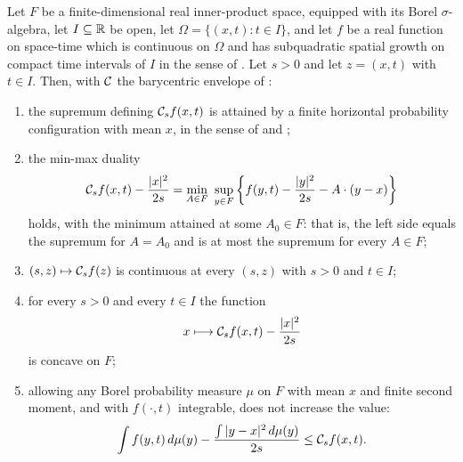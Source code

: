\begin{lemma}
Let $F$ be a finite-dimensional real inner-product space, equipped with its
Borel $\sigma$-algebra, let $I\subseteq\mathbb{R}$ be
open, let $\Omega=\{(x,t):t\in I\}$, and let $f$ be a real function on space-time
which is continuous on $\Omega$ and has subquadratic spatial growth on compact
time intervals of $I$ in the sense of . Let $s>0$
and let $z=(x,t)$ with $t\in I$. Then, with $\mathcal{C}$ the barycentric envelope of
:
\begin{enumerate}
\item the supremum defining $\mathcal{C}_sf(x,t)$ is attained by a finite horizontal
probability configuration with mean $x$, in the sense of 
and ;
\item the min-max duality
\begin{equation}\label{eq:barycentric-duality}
  \mathcal{C}_s f(x,t)-\frac{|x|^2}{2s}
   =\min_{A\in F}\ \sup_{y\in F}
       \left\{f(y,t)-\frac{|y|^2}{2s}-A\cdot(y-x)\right\}
\end{equation}
holds, with the minimum attained at some $A_0\in F$: that is, the left side
equals the supremum for $A=A_0$ and is at most the supremum for every $A\in F$;
\item $(s,z)\mapsto\mathcal{C}_sf(z)$ is continuous at every $(s,z)$ with $s>0$ and
$t\in I$;
\item for every $s>0$ and every $t\in I$ the function
\begin{equation}\label{eq:barycentric-semiconcavity}
  x\longmapsto\mathcal{C}_s f(x,t)-\frac{|x|^2}{2s}
\end{equation}
is concave on $F$;
\item allowing any Borel probability measure $\mu$ on $F$ with mean $x$ and
finite second moment, and with $f(\cdot,t)$ integrable, does not increase the
value:
\[
  \int f(y,t)\,d\mu(y)-\frac{\int|y-x|^2\,d\mu(y)}{2s}
    \le\mathcal{C}_s f(x,t).
\]
\end{enumerate}
\end{lemma}
